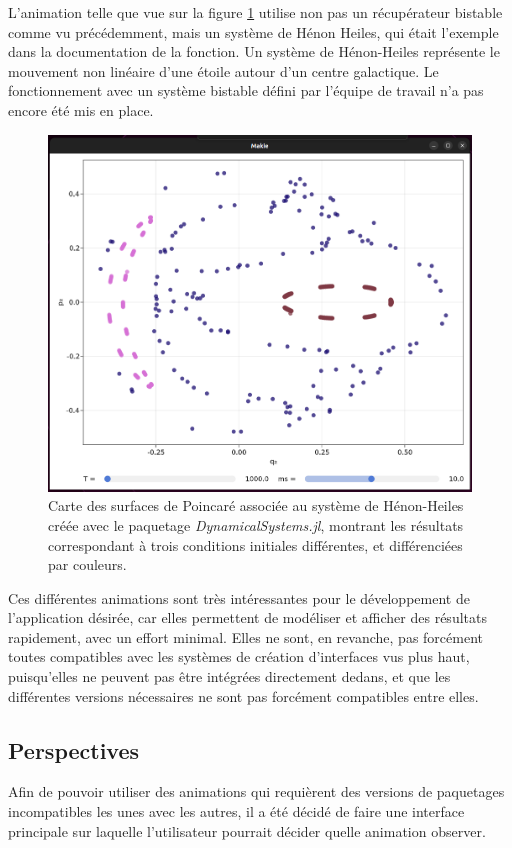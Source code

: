 \documentclass[a4paper, french, 12pt, titlepage]{article}
\begin{document}
L'animation telle que vue sur la figure \ref{fig:fig17} utilise non pas un récupérateur bistable comme vu précédemment, mais un système de Hénon Heiles, qui était l'exemple dans la documentation de la fonction.
Un système de Hénon-Heiles représente le mouvement non linéaire d'une étoile autour d'un centre galactique. 
Le fonctionnement avec un système bistable défini par l'équipe de travail n'a pas encore été mis en place.
\begin{figure}[H]
  \begin{center}
    \includegraphics[width=0.7\linewidth]{poincaremap_2.png}
    \caption{Carte des surfaces de Poincaré associée au système de Hénon-Heiles créée avec le paquetage \emph{DynamicalSystems.jl}, montrant les résultats correspondant à trois conditions initiales différentes, et différenciées par couleurs.}
    \label{fig:fig17}
  \end{center}
\end{figure}


Ces différentes animations sont très intéressantes pour le développement de l'application désirée, car elles permettent de modéliser et afficher des résultats rapidement, avec un effort minimal.
Elles ne sont, en revanche, pas forcément toutes compatibles avec les systèmes de création d'interfaces vus plus haut, puisqu'elles ne peuvent pas être intégrées directement dedans, et que les différentes versions nécessaires ne sont pas forcément compatibles entre elles.


\subsection{Perspectives}

Afin de pouvoir utiliser des animations qui requièrent des versions de paquetages incompatibles les unes avec les autres, il a été décidé de faire une interface principale sur laquelle l'utilisateur pourrait décider quelle animation observer. 
\end{document}
